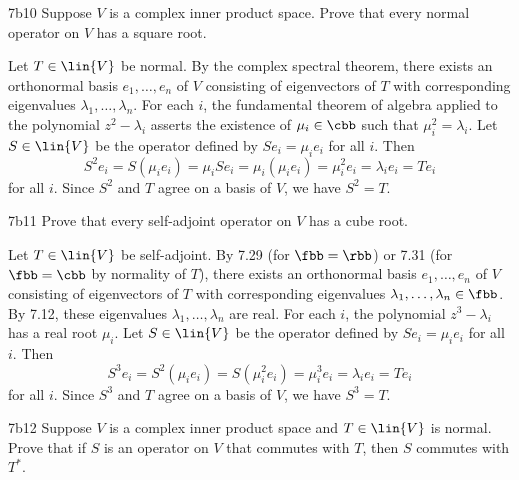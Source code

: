 \begin{exercise}{7b10}
    Suppose $V$ is a complex inner product space.
    Prove that every normal operator on $V$ has a square root.

\end{exercise}

\begin{sol}
    Let $T \in \lin{V}$ be normal.
    By the complex spectral theorem, there exists an orthonormal basis $e_1, \ldots, e_n$ of $V$ consisting of eigenvectors of $T$ with corresponding eigenvalues $\lambda_1, \ldots, \lambda_n$.
    For each $i$, the fundamental theorem of algebra applied to the polynomial $z^2 - \lambda_i$ asserts the existence of $\mu_i \in \cbb$ such that $\mu_i^2 = \lambda_i$.
    Let $S \in \lin{V}$ be the operator defined by $S e_i = \mu_i e_i$ for all $i$.
    Then
    \[
        S^2 e_i = S(\mu_i e_i) = \mu_i S e_i = \mu_i (\mu_i e_i) = \mu_i^2 e_i = \lambda_i e_i = T e_i
    \]
    for all $i$.
    Since $S^2$ and $T$ agree on a basis of $V$, we have $S^2 = T$.
\end{sol}

\begin{exercise}{7b11}
    Prove that every self-adjoint operator on $V$ has a cube root.

\end{exercise}

\begin{sol}
    Let $T \in \lin{V}$ be self-adjoint.
    By 7.29 (for $\fbb = \rbb$) or 7.31 (for $\fbb = \cbb$ by normality of $T$), there exists an orthonormal basis $e_1, \ldots, e_n$ of $V$ consisting of eigenvectors of $T$ with corresponding eigenvalues $\lambda_1, \ldots, \lambda_n \in \fbb$.
    By 7.12, these eigenvalues $\lambda_1, \ldots, \lambda_n$ are real.
    For each $i$, the polynomial $z^3 - \lambda_i$ has a real root $\mu_i$.
    Let $S \in \lin{V}$ be the operator defined by $S e_i = \mu_i e_i$ for all $i$.
    Then
    \[
        S^3 e_i = S^2(\mu_i e_i) = S(\mu_i^2 e_i) = \mu_i^3 e_i = \lambda_i e_i = T e_i
    \]
    for all $i$.
    Since $S^3$ and $T$ agree on a basis of $V$, we have $S^3 = T$.
\end{sol}

\begin{exercise}{7b12}
    Suppose $V$ is a complex inner product space and $T \in \lin{V}$ is normal.
    Prove that if $S$ is an operator on $V$ that commutes with $T$, then $S$ commutes with $T^\ast$.


\end{exercise}

